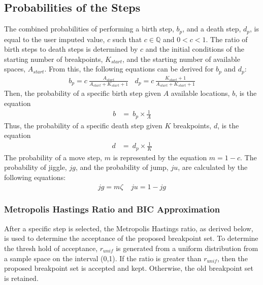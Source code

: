 \documentclass[submit]{smj}
\begin{document}
\subsection{Probabilities of the Steps}
The combined probabilities of performing a birth step, $b_p$, and a death step, $d_p$, is equal to the user imputed value, $c$ such that $c \in \mathbb{Q}$ and $0 < c < 1$. The ratio of birth steps to death steps is determined by $c$ and the initial conditions of the starting number of breakpoints, $K_{start}$, and the starting number of available spaces, $A_{start}$. From this, the following equations can be derived for $b_p$ and $d_p$: 
\begin{align*}
b_p = c  \ \frac{A_{start}}{A_{start}+ K_{start}+1}  \ \ \ \ d_p = c \  \frac{K_{start}+1}{A_{start}+ K_{start}+1}
\end{align*}
Then, the probability of a specific birth step given $A$ available locations, $b$, is the equation 
\begin{align*}
b &= \ b_p \times \frac{1}{A}
\end{align*}
Thus, the probability of a specific death step given $K$ breakpoints, $d$, is the equation
\begin{align*}
d &= \ d_p \times \frac{1}{K}
\end{align*}
The probability of a move step, $m$ is represented by the equation $m = 1-c$. The probability of jiggle, $jg$, and the probability of jump, $ju$, are calculated by the following equations: 
\begin{align*}
jg = m\zeta \ \ \ \ \ ju = 1-jg
\end{align*}

\subsubsection{Metropolis Hastings Ratio and BIC Approximation} 
After a specific step is selected, the Metropolis Hastings ratio, as derived below, is used to determine the acceptance of the proposed breakpoint set. To determine the thresh hold of acceptance,  $r_{unif}$ is generated from a uniform distribution from a sample space on the interval (0,1). If the ratio is greater than $r_{unif}$, then the proposed breakpoint set is accepted and kept. Otherwise, the old breakpoint set is retained. 
\end{document}
